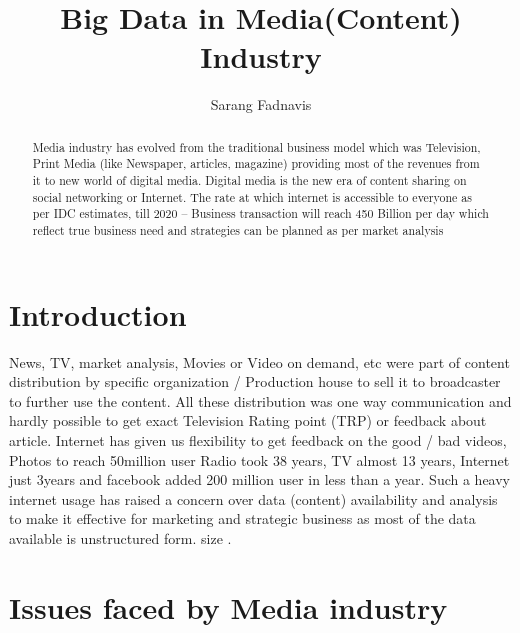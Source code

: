 \documentclass[sigconf]{acmart}
\begin{document}
\title{Big Data in Media(Content) Industry}


\author{Sarang Fadnavis}

\renewcommand{\shortauthors}{B. Trovato et al.}

\begin{abstract}
Media industry has evolved from the traditional business model which was Television, Print Media (like Newspaper, articles, magazine) providing most of the revenues from it to new world of digital media. Digital media is the new era of content sharing on social networking or Internet. The rate at which internet is accessible to everyone as per IDC estimates, till 2020 – Business transaction will reach 450 Billion per day which reflect true business need and strategies can be planned as per market analysis 
\end{abstract}


\maketitle

\section{Introduction}

News, TV, market analysis, Movies or Video on demand, etc were part of content distribution by specific organization / Production house to sell it to broadcaster to further use the content. All these distribution was one way communication and hardly possible to get exact Television Rating point (TRP) or feedback about article. Internet has given us flexibility to get feedback on the good / bad videos, Photos to reach 50million user Radio took 38 years, TV almost 13 years, Internet just 3years and facebook added 200 million user in less than a year. 
Such a heavy internet usage has raised a concern over data (content) availability and analysis to make it effective for marketing and strategic business as most of the data available is unstructured form. 
size \cite{Teaches}.

\section{Issues faced by Media industry}
\end{document}
